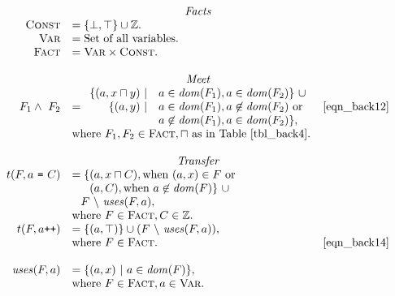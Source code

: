 \begin{myfig}
  \begin{math}
    \begin{array}{rlr}

      \multicolumn{3}{c}{\emph{Facts}} \\

      \setLC &= \{\bot, \top\} \cup \ZZ.\\
      \setL{Var} &= \text{Set of all variables.} \\
      \setL{Fact} &= \setL{Var} \times \setLC. \\\\

      \multicolumn{3}{c}{\emph{Meet}} \\

      F_1 \wedge\ F_2 &= \begin{array}{rl}
        \{(a, x \lub y)\ | & a \in \dom(F_1), a \in \dom(F_2)\}\ \cup \\
        \{(a, y)\ | & a \in \dom(F_1), a \not\in \dom(F_2)\ \text{or} \\
                     & a \not\in \dom(F_1), a \in \dom(F_2)\},
      \end{array} \labeleq{eqn_back13} \labeleq{eqn_back12} & \eqref{eqn_back12} \\
      & \text{where\ } F_1, F_2 \in \setL{Fact}, \lub\ \text{as in Table~\ref{tbl_back4}.} \\\\

      \multicolumn{3}{c}{\emph{Transfer}} \\
      t (F, a\ \text{\tt =}\ C) &= \{(a, x \lub C), \text{when\ } (a, x) \in F\ \text{or} \\
                     & \phantom{= \{}(a, C), \text{when\ } a \not\in \dom(F)\}\ \cup \\
                     & \phantom{=} F\ \backslash\ \mfun{uses}(F, a),\\
          & \text{where\ } F \in \setL{Fact}, C \in \ZZ. \\
      t (F, a\text{\tt ++}) &= \{(a, \top)\} \cup (F\ \backslash\ \mfun{uses}(F, a)), \\
      & \text{where\ } F \in \setL{Fact}. \labeleq{eqn_back14} & \eqref{eqn_back14} \\\\
      \mfun{uses}(F, a) &= \{(a, x)\ |\ a \in \dom(F)\}, \\
      & \text{where\ } F \in \setL{Fact}, a \in \setL{Var}. \\\\


\end{array}
\end{math}
\end{myfig}
